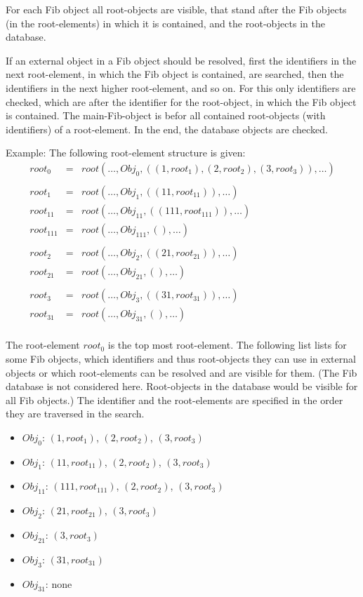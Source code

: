 For each Fib object all root-objects are visible, that stand after the Fib objects (in the root-elements) in which it is contained, and the root-objects in the database.

If an external object  in a Fib object should be resolved, first the identifiers in the next root-element, in which the Fib object is contained, are searched, then the identifiers in the next higher root-element, and so on. For this only identifiers are checked, which are after the identifier for the root-object, in which the Fib object is contained. The main-Fib-object is befor all contained root-objects (with identifiers) of a root-element. In the end, the database objects are checked.

\bigskip\noindent
Example: The following root-element structure is given:
\begin{eqnarray*}
root_0&=&root( \ldots , Obj_0 , (( 1, root_1), ( 2, root_2), ( 3, root_3)), \ldots )\\
\\
root_1&=&root( \ldots , Obj_1 , (( 11, root_{11})),  \ldots )\\
root_{11}&=&root( \ldots , Obj_{11} , (( 111, root_{111})), \ldots )\\
root_{111}&=&root( \ldots , Obj_{111} , (), \ldots )\\
\\
root_2&=&root( \ldots , Obj_2 , (( 21, root_{21})),  \ldots )\\
root_{21}&=&root( \ldots , Obj_{21} , (), \ldots )\\
\\
root_3&=&root( \ldots , Obj_3 , (( 31, root_{31})),  \ldots )\\
root_{31}&=&root( \ldots , Obj_{31} , (), \ldots )\\
\end{eqnarray*}

The root-element $root_0$ is the top most root-element.
The following list lists for some Fib objects, which identifiers and thus root-objects they can use in external objects or which root-elements can be resolved and are visible for them. (The Fib database is not considered here. Root-objects in the database would be visible for all Fib objects.) The identifier and the root-elements are specified in the order they are traversed in the search.
\begin{itemize}
 \item $Obj_0$: $( 1, root_1)$, $( 2, root_2)$, $( 3, root_3)$
 \item $Obj_1$: $( 11, root_{11})$, $( 2, root_2)$, $( 3, root_3)$
 \item $Obj_{11}$: $( 111, root_{111})$, $( 2, root_2)$, $( 3, root_3)$
 \item $Obj_2$: $( 21, root_{21})$, $( 3, root_3)$
 \item $Obj_{21}$: $( 3, root_3)$
 \item $Obj_3$: $( 31, root_{31})$
 \item $Obj_{31}$: none
\end{itemize}

